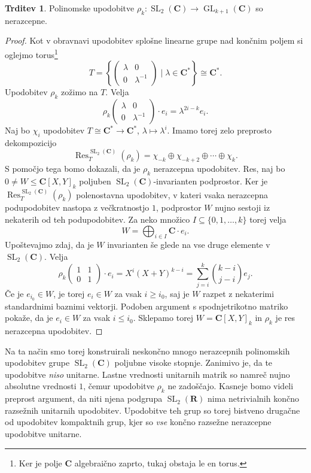 \documentclass[11pt]{book}
\def\RR{\mathbf{R}}
\def\CC{\mathbf{C}}
\DeclareMathOperator\Res{Res}
\DeclareMathOperator\GL{GL}
\DeclareMathOperator\SL{SL}
\theoremstyle{definition}
\theoremstyle{zgled}
\theoremstyle{zgledbrezstevilke}
\theoremstyle{odprtproblem}
\theoremstyle{domacanaloga}
\newenvironment{dokaz}
    {\color{siva}\begin{proof}}
    {\end{proof}}
\theoremstyle{izrek}
\newtheorem{trditev}[theorem]{Trditev}
\begin{document}
\begin{trditev}
Polinomske upodobitve $\rho_k \colon \SL_2(\CC) \to \GL_{k+1}(\CC)$ so nerazcepne.
\end{trditev}
\begin{dokaz}
Kot v obravnavi upodobitev splošne linearne grupe nad končnim poljem si oglejmo torus\footnote{Ker je polje $\CC$ algebraično zaprto, tukaj obstaja le en torus.}
\[
    T = \left\{ 
        \begin{pmatrix}
            \lambda & 0 \\ 0 & \lambda^{-1}
        \end{pmatrix}        
        \mid
        \lambda \in \CC^*
    \right\} \cong \CC^*.
\]
Upodobitev $\rho_k$ zožimo na $T$. Velja
\[
    \rho_k \begin{pmatrix}
        \lambda & 0 \\ 0 & \lambda^{-1}
    \end{pmatrix}
    \cdot e_i
    = \lambda^{2i - k} e_i.
\]
Naj bo $\chi_i$ upodobitev $T \cong \CC^* \to \CC^*$, $\lambda \mapsto \lambda^i$. Imamo torej zelo preprosto dekompozicijo
\[
    {\textstyle \Res^{\SL_2(\CC)}_T(\rho_k)}
    = 
    \chi_{-k} \oplus \chi_{-k+2} \oplus \cdots \oplus \chi_{k}.
\]
S pomočjo tega bomo dokazali, da je $\rho_k$ nerazcepna upodobitev. Res, naj bo $0 \neq W \leq \CC[X,Y]_k$ poljuben $\SL_2(\CC)$-invarianten podprostor. Ker je $\Res^{\SL_2(\CC)}_T(\rho_k)$ polenostavna upodobitev, v kateri vsaka nerazcepna podupodobitev nastopa z večkratnostjo $1$, podprostor $W$ nujno sestoji iz nekaterih od teh podupodobitev. Za neko množico $I \subseteq \{ 0,1,\dots,k\}$ torej velja
\[
    W = \bigoplus_{i \in I} \CC \cdot e_i.
\]
Upoštevajmo zdaj, da je $W$ invarianten še glede na vse druge elemente v $\SL_2(\CC)$. Velja
\[
    \rho_k \begin{pmatrix}
        1 & 1 \\ 0 & 1
    \end{pmatrix}
    \cdot e_i
    = X^i (X+Y)^{k-i}
    = \sum_{j = i}^k \binom{k-i}{j-i} e_j.
\]
Če je $e_{i_0} \in W$, je torej $e_i \in W$ za vsak $i \geq i_0$, saj je $W$ razpet z nekaterimi standardnimi baznimi vektorji. Podoben argument s spodnjetrikotno matriko pokaže, da je $e_i \in W$ za vsak $i \leq i_0$. Sklepamo torej $W = \CC[X,Y]_k$ in $\rho_k$ je res nerazcepna upodobitev.
\end{dokaz}

Na ta način smo torej konstruirali neskončno mnogo nerazcepnih polinomskih upodobitev grupe $\SL_2(\CC)$ poljubne visoke stopnje. Zanimivo je, da te upodobitve \emph{niso} unitarne. Lastne vrednosti unitarnih matrik so namreč nujno absolutne vrednosti $1$, čemur upodobitve $\rho_k$ ne zadoščajo. Kasneje bomo videli preprost argument, da niti njena podgrupa $\SL_2(\RR)$ nima netrivialnih končno razsežnih unitarnih upodobitev. Upodobitve teh grup so torej bistveno drugačne od upodobitev kompaktnih grup, kjer so \emph{vse} končno razsežne nerazcepne upodobitve unitarne.
\end{document}
